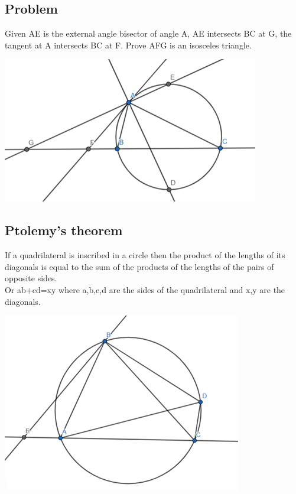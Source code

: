 \documentclass{article}
\begin{document}
\subsection{Problem}

Given AE is the external angle bisector of angle A, 
AE intersects BC at G, 
the tangent at A intersects BC at F. 
Prove AFG is an isosceles triangle.

\includegraphics{Picture19.png}

\pagebreak

\subsection{Ptolemy's theorem}

If a quadrilateral is inscribed in a circle then the product of the lengths of its diagonals is equal to the sum of the products of the lengths of the pairs of opposite sides.
\\Or ab+cd=xy where a,b,c,d are the sides of the quadrilateral and x,y are the diagonals.

\includegraphics{Picture20.png}

\pagebreak
\end{document}
